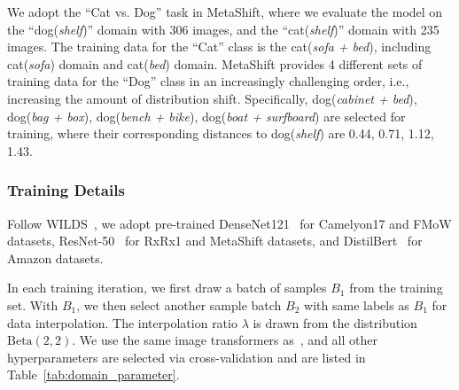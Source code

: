 We adopt the “Cat vs. Dog” task in MetaShift, where we evaluate the model on the “dog(\emph{shelf})” domain with 306 images, and the “cat(\emph{shelf})” domain with 235 images. The training data for the “Cat” class is the cat(\emph{sofa + bed}), including cat(\emph{sofa}) domain and cat(\emph{bed}) domain. MetaShift provides 4 different sets of training data for the “Dog” class in an increasingly challenging order, i.e., increasing the amount of distribution shift. Specifically, dog(\emph{cabinet + bed}), dog(\emph{bag + box}), dog(\emph{bench + bike}), dog(\emph{boat + surfboard}) are selected for training, where their corresponding distances to dog(\emph{shelf}) are 0.44, 0.71, 1.12, 1.43.





\subsubsection{Training Details}
\label{sec:app_domain_training}
Follow WILDS~\citet{koh2021wilds}, we adopt pre-trained DenseNet121~\citep{huang2017densely} for Camelyon17 and FMoW datasets, ResNet-50~\citep{he2016deep} for RxRx1 and MetaShift datasets, and DistilBert~\citep{sanh2019distilbert} for Amazon datasets.

In each training iteration, we first draw a batch of samples $B_1$ from the training set. With $B_1$, we then select another sample batch $B_2$ with same labels as $B_1$ for data interpolation. The interpolation ratio $\lambda$ is drawn from the distribution $\mathrm{Beta}(2,2)$. We use the same image transformers as~\citet{koh2021wilds}, and all other hyperparameters are selected via cross-validation and are listed in Table~\ref{tab:domain_parameter}.



